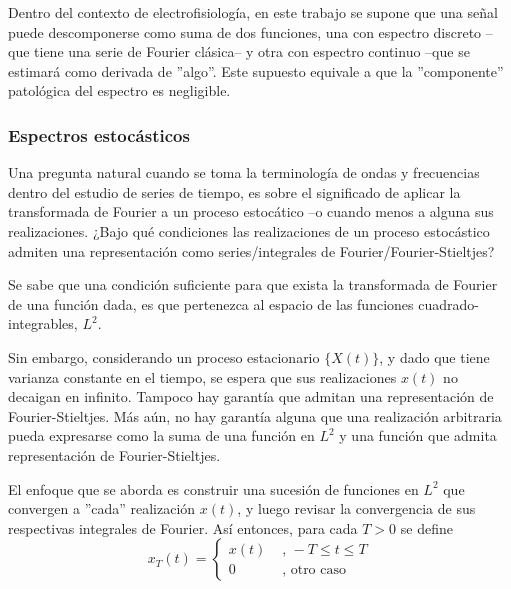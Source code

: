 Dentro del contexto de electrofisiolog\'ia, en este trabajo se supone
que una se\~nal puede descomponerse
como suma de dos funciones, una con espectro discreto --que tiene una serie de Fourier cl\'asica--
y otra con espectro continuo --que se estimar\'a como derivada de ''algo''.
Este supuesto equivale a que la ''componente'' patol\'ogica del espectro es negligible.



\subsubsection{Espectros estoc\'asticos}

Una pregunta natural cuando se toma la terminolog\'ia de ondas y frecuencias dentro
del estudio de series de tiempo, es sobre el significado de aplicar la transformada de Fourier a
un proceso estoc\'atico --o cuando menos a alguna sus realizaciones.
¿Bajo qu\'e condiciones las realizaciones de un proceso estoc\'astico admiten una representaci\'on
como series/integrales de Fourier/Fourier-Stieltjes?


Se sabe que una condici\'on suficiente para que exista la transformada de Fourier de una funci\'on
dada, es que pertenezca al espacio de las funciones cuadrado-integrables, $L^2$.

Sin embargo, considerando un proceso estacionario $\{ X(t) \}$, y dado que tiene varianza constante 
en el tiempo, se 
espera que sus realizaciones $x(t)$ no decaigan en infinito. Tampoco hay garant\'ia
que admitan una representaci\'on de Fourier-Stieltjes. M\'as a\'un, no hay garant\'ia alguna que
una realizaci\'on arbitraria pueda expresarse como la suma de una funci\'on en $L^2$ y una
funci\'on que admita representaci\'on de Fourier-Stieltjes.

El enfoque que se aborda es construir una sucesi\'on de funciones 
en $L^{2}$
que convergen a ''cada'' realizaci\'on
$x(t)$, y luego revisar la convergencia de sus respectivas integrales de Fourier.
As\'i entonces, para cada $T>0$ se define
\begin{equation}
x_T(t) = 
\begin{cases}
x(t) & \text{ , } -T\leq t \leq T
\\
0 & \text{ , otro caso}
\end{cases}
\end{equation}

